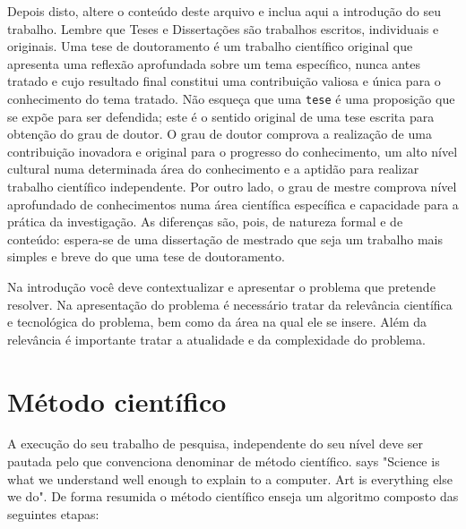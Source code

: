 Depois disto, altere o conteúdo deste arquivo e inclua aqui a introdução do seu trabalho. Lembre que Teses e Dissertações são trabalhos escritos, individuais e
originais. Uma tese de doutoramento é um trabalho científico original
que apresenta uma reflexão aprofundada sobre um tema específico,
nunca antes tratado e cujo resultado final constitui uma contribuição
valiosa e única para o conhecimento do tema tratado. Não esqueça
que uma \texttt{tese} é uma proposição que se expõe para ser
defendida; este é o sentido original de uma tese escrita para
obtenção do grau de doutor. O grau de doutor comprova a
realização de uma contribuição inovadora e original para o
progresso do conhecimento, um alto nível cultural numa determinada
área do conhecimento e a aptidão para realizar trabalho
científico independente. Por outro lado, o grau de mestre comprova nível aprofundado
de conhecimentos numa área científica específica e capacidade
para a prática da investigação. As diferenças são, pois,
de natureza formal e de conteúdo: espera-se de uma dissertação de
mestrado que seja um trabalho mais simples e breve do que uma tese de doutoramento.

Na introdução você deve contextualizar e apresentar o problema que pretende resolver. Na apresentação do problema é necessário tratar da relevância científica e tecnológica do problema, bem como da área na qual ele se insere. Além da relevância é importante tratar a atualidade e da complexidade do problema. 

\section{Método científico}
A execução do seu trabalho de pesquisa, independente do seu nível deve ser pautada pelo que convenciona denominar de método científico. 
\citeauthor{knuth:tex} says "Science is what we understand well enough to explain to a computer. Art is everything else we do". De forma resumida o método científico enseja um algoritmo composto das seguintes etapas:

